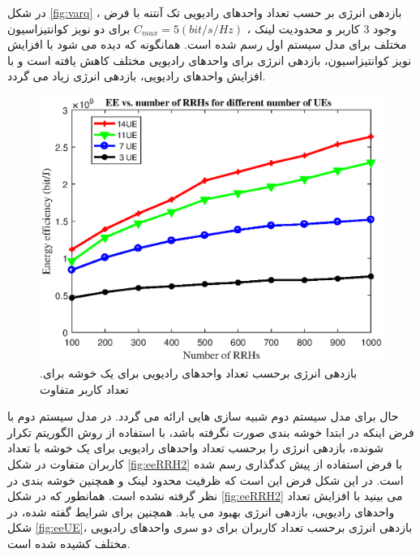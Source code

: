  در شکل \ref{fig:varq} ، بازدهی انرژی بر حسب تعداد واحدهای رادیویی تک آنتنه با فرض وجود 3 کاربر و محدودیت 
لینک ، $C_{max} = 5 (bit/s/Hz)$ برای دو نویز کوانتیزاسیون مختلف برای مدل سیستم اول رسم شده است. همانگونه که دیده می شود با افزایش نویز کوانتیزاسیون، بازدهی انرژی برای واحدهای رادیویی مختلف کاهش یافته است و با افزایش واحدهای رادیویی، بازدهی انرژی زیاد می گردد.
\begin{figure}[H]
  \centering
    \includegraphics[width=\linewidth]{./fig/eeRRH}
  \caption{ .بازدهی انرژی برحسب تعداد واحدهای رادیویی برای یک خوشه برای تعداد کاربر متفاوت}
  \label{fig:eeRRH2}
  \end{figure}
حال برای مدل سیستم دوم شبیه سازی هایی ارائه می گردد.
در مدل سیستم دوم با فرض اینکه در ابتدا خوشه بندی صورت نگرفته باشد، با استفاده از روش الگوریتم تکرار شونده، بازدهی انرژی را برحسب تعداد واحدهای رادیویی برای یک خوشه با تعداد کاربران متفاوت  در شکل \eqref{fig:eeRRH2} با فرض استفاده از پیش کدگذاری  رسم شده است. در این شکل فرض این است که ظرفیت محدود لینک  و همچنین خوشه بندی در نظر گرفته نشده است. همانطور که در شکل \eqref{fig:eeRRH2} می بینید با افزایش تعداد واحدهای رادیویی، بازدهی انرژی بهبود می یابد. \newline
همچنین برای  شرایط گفته شده، در شکل \eqref{fig:eeUE}، بازدهی انرژی برحسب تعداد کاربران برای دو سری واحدهای رادیویی مختلف کشیده شده است.
